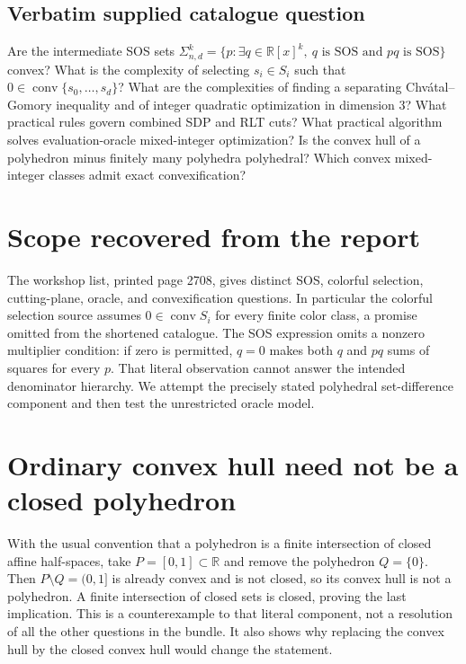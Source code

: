 \documentclass[11pt]{article}
\begin{document}
\subsection{Verbatim supplied catalogue question}
Are the intermediate SOS sets $\Sigma^k_{n,d}=\{p:\exists q\in\mathbb{R}[x]^k,\ q\text{ is SOS and }pq\text{ is SOS}\}$ convex? What is the complexity of selecting $s_i\in S_i$ such that $0\in\operatorname{conv}\{s_0,\ldots,s_d\}$? What are the complexities of finding a separating Chvátal–Gomory inequality and of integer quadratic optimization in dimension $3$? What practical rules govern combined SDP and RLT cuts? What practical algorithm solves evaluation-oracle mixed-integer optimization? Is the convex hull of a polyhedron minus finitely many polyhedra polyhedral? Which convex mixed-integer classes admit exact convexification?

\section{Scope recovered from the report}
The workshop list, printed page 2708, gives distinct SOS, colorful selection,
cutting-plane, oracle, and convexification questions. In particular the colorful
selection source assumes $0\in\operatorname{conv}S_i$ for every finite color
class, a promise omitted from the shortened catalogue. The SOS expression
omits a nonzero multiplier condition: if zero is permitted, $q=0$ makes both
$q$ and $pq$ sums of squares for every $p$. That literal observation cannot
answer the intended denominator hierarchy. We attempt the precisely stated
polyhedral set-difference component and then test the unrestricted oracle model.

\section{Ordinary convex hull need not be a closed polyhedron}
With the usual convention that a polyhedron is a finite intersection of closed
affine half-spaces, take $P=[0,1]\subset\mathbb R$ and remove the polyhedron
$Q=\{0\}$. Then $P\setminus Q=(0,1]$ is already convex and is not closed,
so its convex hull is not a polyhedron. A finite intersection of closed sets
is closed, proving the last implication. This is a counterexample to that
literal component, not a resolution of all the other questions in the bundle.
It also shows why replacing the convex hull by the closed convex hull would
change the statement.
\end{document}
